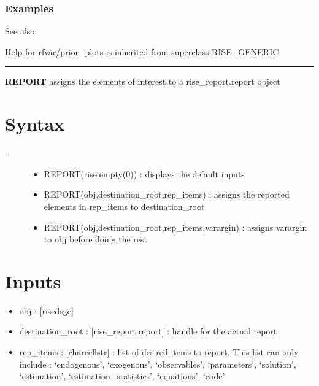 \documentclass[letterpaper,10pt,english]{sphinxmanual}
\begin{document}
\subsubsection{Examples}
\label{classes/models/@rfvar/rfvar:id99}
See also:

Help for rfvar/prior\_plots is inherited from superclass RISE\_GENERIC


\bigskip\hrule{}\bigskip

\label{classes/models/@rfvar/rfvar:report}
\textbf{REPORT} assigns the elements of interest to a rise\_report.report object


\section{Syntax}
\label{classes/models/@rfvar/rfvar:id100}\begin{description}
\item[{::}] \leavevmode\begin{itemize}
\item {} 
REPORT(rise.empty(0)) : displays the default inputs

\item {} 
REPORT(obj,destination\_root,rep\_items) : assigns the reported
elements in rep\_items to destination\_root

\item {} 
REPORT(obj,destination\_root,rep\_items,varargin) : assigns varargin to
obj before doing the rest

\end{itemize}

\end{description}


\section{Inputs}
\label{classes/models/@rfvar/rfvar:id101}\begin{itemize}
\item {} 
obj : {[}rise\textbar{}dsge{]}

\item {} 
destination\_root : {[}rise\_report.report{]} : handle for the actual report

\item {} 
rep\_items : {[}char\textbar{}cellstr{]} : list of desired items to report. This list
can only include : `endogenous', `exogenous', `observables',
`parameters', `solution', `estimation', `estimation\_statistics',
`equations', `code'

\end{itemize}
\end{document}
